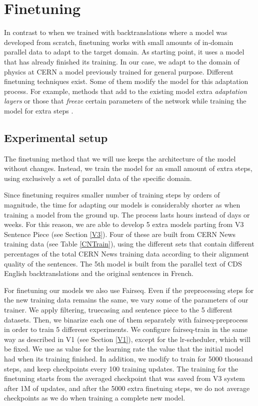 \documentclass[11pt,english,listoffigures,listoftables]{tfgetsinf}
\begin{document}
\section{Finetuning}\label{fine}
In contrast to when we trained with backtranslations where a model was developed from scratch, finetuning works with small amounts of in-domain parallel data to adapt to the target domain. As starting point, it uses a model that has already finished its training. In our case, we adapt to the domain of physics at CERN a model previously trained for general purpose. Different finetuning techniques exist. Some of them modify the model for this adaptation process. For example, methods that add to the existing model extra \textit{adaptation layers} \cite{DBLP:journals/corr/abs-1803-10082} or those that \textit{freeze} certain parameters of the network while training the model for extra steps \cite{DBLP:journals/corr/abs-1801-06146}.

\subsection{Experimental setup}
The finetuning method that we will use keeps the architecture of the model without changes. Instead, we train the model for an small amount of extra steps, using exclusively a set of parallel data of the specific domain.

Since finetuning requires smaller number of training steps by orders of magnitude, the time for adapting our models is considerably shorter as when training a model from the ground up. The process lasts hours instead of days or weeks. 
For this reason, we are able to develop 5 extra models parting from V3 Sentence Piece (see Section \ref{V3}). Four of these are built from CERN News training data (see Table \ref{CNTrain}), using the different sets that contain different percentages of the total CERN News training data according to their alignment quality of the sentences. The 5th model is built from the parallel text of CDS English backtranslations and the original sentences in French. 

For finetuning our models we also use Fairseq. Even if the preprocessing steps for the new training data remains the same, we vary some of the parameters of our trainer. We apply filtering, truecasing and sentence piece to the 5 different datasets. Then, we binarize each one of them separately with fairseq-preprocess in order to train 5 different experiments. We configure fairseq-train in the same way as described in V1 (see Section \ref{V1}), except for the lr-scheduler, which will be fixed. We use as value for the learning rate the value that the initial model had when its training finished. In addition, we modify to train for 5000 thousand steps, and keep checkpoints every 100 training updates. The training for the finetuning starts from the averaged checkpoint that was saved from V3 system after 1M of updates, and after the 5000 extra finetuing steps, we do not average checkpoints as we do when training a complete new model.
\end{document}
